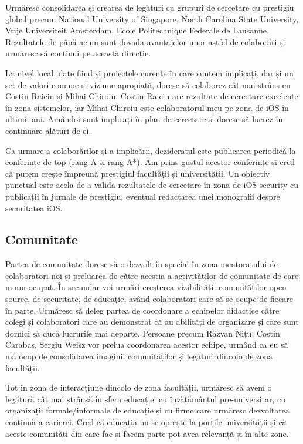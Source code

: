 \documentclass[11pt,a4paper]{article}
\begin{document}
Urmăresc consolidarea și crearea de legături cu grupuri de cercetare cu prestigiu global precum National University of Singapore, North Carolina State University, Vrije Universiteit Amsterdam, Ecole Politechnique Federale de Lausanne. Rezultatele de până acum sunt dovada avantajelor unor astfel de colaborări și urmăresc să continui pe această direcție.

La nivel local, date fiind și proiectele curente în care suntem implicați, dar și un set de valori comune și viziune apropiată, doresc să colaborez cât mai strâns cu Costin Raiciu și Mihai Chiroiu. Costin Raiciu are rezultate de cercetare excelente în zona sistemelor, iar Mihai Chiroiu este colaboratorul meu pe zona de iOS în ultimii ani. Amândoi sunt implicați în plan de cercetare și doresc să lucrez în continuare alături de ei.

Ca urmare a colaborărilor și a implicării, dezideratul este publicarea periodică la conferințe de top (rang A și rang A*). Am prins gustul acestor conferințe și cred că putem crește împreună prestigiul facultății și universității. Un obiectiv punctual este acela de a valida rezultatele de cercetare în zona de iOS security cu publicații în jurnale de prestigiu, eventual redactarea unei monografii despre securitatea iOS.

\subsection*{Comunitate}

Partea de comunitate doresc să o dezvolt în special în zona mentoratului de colaboratori noi și preluarea de către aceștia a activităților de comunitate de care m-am ocupat. În secundar voi urmări creșterea vizibilității comunităților open source, de securitate, de educație, având colaboratori care să se ocupe de fiecare în parte. Urmăresc să deleg partea de coordonare a echipelor didactice către colegi și colaboratori care au demonstrat că au abilități de organizare și care sunt dornici să ducă lucrurile mai departe. Persoane precum Răzvan Nițu, Costin Carabaș, Sergiu Weisz vor prelua coordonarea acestor echipe, urmând ca eu să mă ocup de consolidarea imaginii comunităților și legături dincolo de zona facultății.

Tot în zona de interacțiune dincolo de zona facultății, urmăresc să avem o legătură cât mai strânsă în sfera educației cu învățământul pre-universitar, cu organizații formale/informale de educație și cu firme care urmăresc dezvoltarea continuă a carierei. Cred că educația nu se oprește la porțile universității și că aceste comunități din care fac și facem parte pot avea relevanță și în alte zone.
\end{document}
